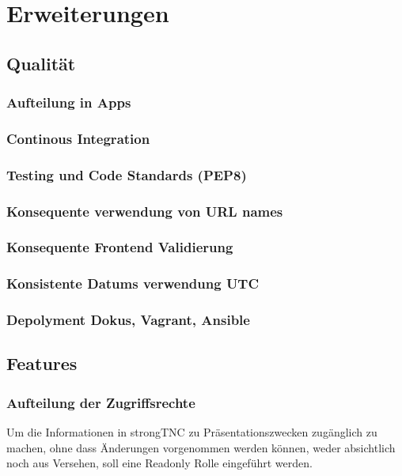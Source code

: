 \section{Erweiterungen}

\subsection{Qualität}

\subsubsection{Aufteilung in Apps}

\subsubsection{Continous Integration}

\subsubsection{Testing und Code Standards (PEP8)}

\subsubsection{Konsequente verwendung von URL names}

\subsubsection{Konsequente Frontend Validierung}

\subsubsection{Konsistente Datums verwendung UTC}

\subsubsection{Depolyment Dokus, Vagrant, Ansible}

\subsection{Features}

\subsubsection{Aufteilung der Zugriffsrechte}
Um die Informationen in strongTNC zu Präsentationszwecken zugänglich zu machen,
ohne dass Änderungen vorgenommen werden können, weder absichtlich noch aus
Versehen, soll eine Readonly Rolle eingeführt werden.

